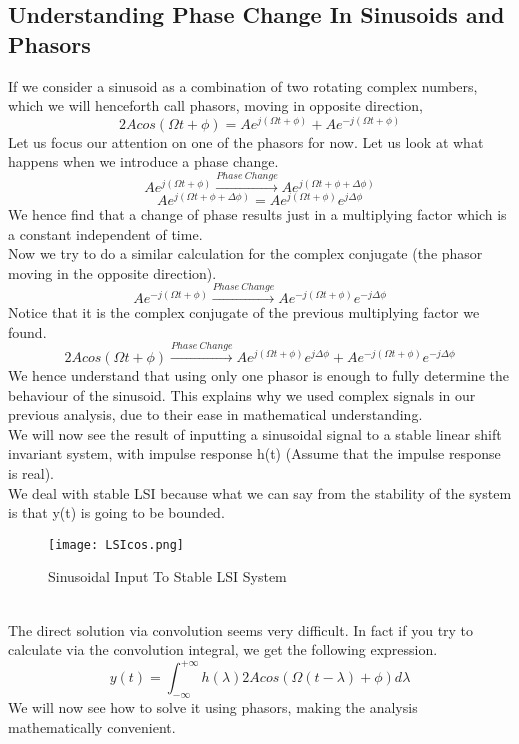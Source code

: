 \subsection{Understanding Phase Change In Sinusoids and Phasors}
If we consider a sinusoid as a combination of two rotating complex numbers, which we will henceforth call phasors, moving in opposite direction, 
\[
	2Acos(\Omega t + \phi) = Ae^{j(\Omega t + \phi)} + Ae^{-j(\Omega t + \phi)}
\]
Let us focus our attention on one of the phasors for now. Let us look at what happens when we introduce a phase change.\\
\[
Ae^{j(\Omega t + \phi)} \xrightarrow{Phase \ Change} Ae^{j(\Omega t + \phi + \Delta\phi)}
\]
\[
Ae^{j(\Omega t + \phi + \Delta\phi)} =
Ae^{j(\Omega t + \phi)}e^{j\Delta\phi}
\]
We hence find that a change of phase results just in a multiplying factor which is a constant independent of time.\\
Now we try to do a similar calculation for the complex conjugate (the phasor moving in the opposite direction).
\[
Ae^{-j(\Omega t + \phi)} \xrightarrow{Phase \ Change} Ae^{-j(\Omega t + \phi)}e^{-j\Delta\phi}
\]
Notice that it is the complex conjugate of the previous multiplying factor we found.\\
\[
	2Acos(\Omega t + \phi) \xrightarrow{Phase \ Change} Ae^{j(\Omega t + \phi)}e^{j\Delta\phi} + Ae^{-j(\Omega t + \phi)}e^{-j\Delta\phi}
\]
We hence understand that using only one phasor is enough to fully determine the behaviour of the sinusoid. This explains why we used complex signals in our previous analysis, due to their ease in mathematical understanding.\\
We will now see the result of inputting a sinusoidal signal to a stable linear shift invariant system, with impulse response h(t) (Assume that the impulse response is real).\\
We deal with stable LSI because what we can say from the stability of the system is that y(t) is going to be bounded.\\
\begin{figure}[h!]
\begin{center}
\texttt{[image: LSIcos.png]}
\caption{Sinusoidal Input To Stable LSI System}
\end{center}
\end{figure}\\
The direct solution via convolution seems very difficult. In fact if you try to calculate via the convolution integral, we get the following expression.
\[
y(t) = \int_{-\infty}^{+\infty}{h(\lambda)2Acos(\Omega(t-\lambda) + \phi)d\lambda}\]
We will now see how to solve it using phasors, making the analysis mathematically convenient.

